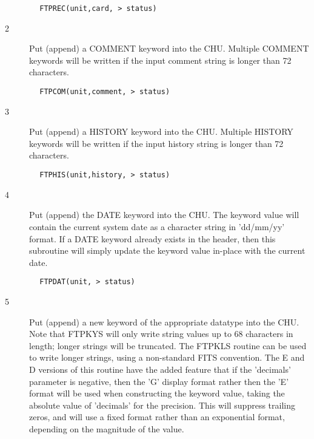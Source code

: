 \documentclass[11pt]{book}
\begin{document}
\begin{verbatim}
        FTPREC(unit,card, > status)
\end{verbatim}

\begin{description}
\item[2 ] Put (append) a COMMENT keyword into the CHU.  Multiple COMMENT keywords
   will be written if the input comment string is longer than 72 characters.
\end{description}

\begin{verbatim}
        FTPCOM(unit,comment, > status)
\end{verbatim}

\begin{description}
\item[3 ]Put (append) a HISTORY keyword into the CHU.  Multiple HISTORY keywords
   will be written if the input history string is longer than 72 characters.
\end{description}

\begin{verbatim}
        FTPHIS(unit,history, > status)
\end{verbatim}

\begin{description}
\item[4 ] Put (append) the DATE keyword into the CHU.  The keyword value will contain
    the current system date as a character string in 'dd/mm/yy' format. If
    a DATE keyword already exists in the header, then this subroutine will
   simply update the keyword value in-place with the current date.
\end{description}

\begin{verbatim}
        FTPDAT(unit, > status)
\end{verbatim}

\begin{description}
\item[5 ] Put (append) a new keyword of the appropriate datatype into the CHU.
    Note that FTPKYS will only write string values up to 68 characters in
    length; longer strings will be truncated.  The FTPKLS routine can be
    used to write longer strings, using a non-standard FITS convention.
     The E and D versions of this routine have the added feature that
     if the 'decimals' parameter is negative, then the 'G' display
     format rather then the 'E' format will be used when constructing
     the keyword value, taking the absolute value of 'decimals' for the
     precision.  This will suppress trailing zeros, and will use a
     fixed format rather than an exponential format,
    depending on the magnitude of the value.
\end{description}
\end{document}
